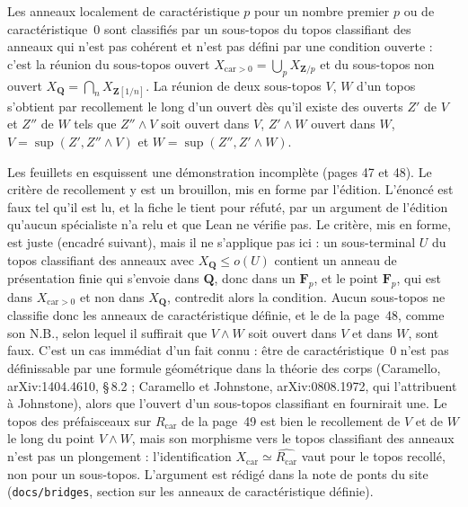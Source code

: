 \begin{encadre}
\begin{theoreme*}\nonverifie
Les anneaux localement de caractéristique $p$ pour un nombre premier $p$ ou de caractéristique~$0$ sont classifiés par un sous-topos du topos classifiant des anneaux qui n'est pas cohérent et n'est pas défini par une condition ouverte : c'est la réunion du sous-topos ouvert $X_{\mathrm{car} > 0} = \bigcup_p X_{\mathbf Z/p}$ et du sous-topos non ouvert $X_{\mathbf Q} = \bigcap_n X_{\mathbf Z[1/n]}$. La réunion de deux sous-topos $V$, $W$ d'un topos s'obtient par recollement le long d'un ouvert dès qu'il existe des ouverts $Z'$ de $V$ et $Z''$ de $W$ tels que $Z'' \wedge V$ soit ouvert dans $V$, $Z' \wedge W$ ouvert dans $W$, $V = \sup(Z', Z'' \wedge V)$ et $W = \sup(Z'', Z' \wedge W)$.
\end{theoreme*}
\end{encadre}
{\small Les feuillets en esquissent une démonstration incomplète (pages 47 et 48). Le critère de recollement y est un brouillon, mis en forme par l'édition. L'énoncé est faux tel qu'il est lu, et la fiche le tient pour réfuté, par un argument de l'édition qu'aucun spécialiste n'a relu et que Lean ne vérifie pas. Le critère, mis en forme, est juste (encadré suivant), mais il ne s'applique pas ici : un sous-terminal $U$ du topos classifiant des anneaux avec $X_{\mathbf Q} \leq o(U)$ contient un anneau de présentation finie qui s'envoie dans $\mathbf Q$, donc dans un $\mathbf F_p$, et le point $\mathbf F_p$, qui est dans $X_{\mathrm{car} > 0}$ et non dans $X_{\mathbf Q}$, contredit alors la condition. Aucun sous-topos ne classifie donc les anneaux de caractéristique définie, et le  de la page~48, comme son N.B., selon lequel il suffirait que $V \wedge W$ soit ouvert dans $V$ et dans $W$, sont faux. C'est un cas immédiat d'un fait connu : être de caractéristique~$0$ n'est pas définissable par une formule géométrique dans la théorie des corps (Caramello, arXiv:1404.4610, §\,8.2 ; Caramello et Johnstone, arXiv:0808.1972, qui l'attribuent à Johnstone), alors que l'ouvert d'un sous-topos classifiant en fournirait une. Le topos des préfaisceaux sur $R_{\mathrm{car}}$ de la page~49 est bien le recollement de $V$ et de $W$ le long du point $V \wedge W$, mais son morphisme vers le topos classifiant des anneaux n'est pas un plongement : l'identification $X_{\mathrm{car}} \simeq \widehat{R_{\mathrm{car}}}$ vaut pour le topos recollé, non pour un sous-topos. L'argument est rédigé dans la note de ponts du site (\texttt{docs/bridges}, section sur les anneaux de caractéristique définie).\par}

